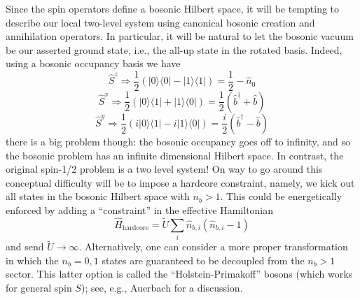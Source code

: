 Since the spin operators define a bosonic Hilbert space, it will be tempting to describe our local two-level system using canonical bosonic creation and annihilation operators. In particular, it will be natural to let the bosonic vacuum be our asserted ground state, i.e., the all-up state in the rotated basis. Indeed, using a bosonic occupancy basis we have
\[ \hat{S}^z\Rightarrow \frac{1}{2}\left( |0\rangle \langle 0|-|1\rangle \langle 1| \right) =\frac{1}{2}-\hat{n}_0\]
\[ \hat{S}^x\Rightarrow \frac{1}{2}\left( |0\rangle \langle 1|+|1\rangle \langle 0| \right) =\frac{1}{2}\left( \hat{b}^{\dagger}+\hat{b} \right) \]
\[ \hat{S}^y\Rightarrow \frac{1}{2}\left( i|0\rangle \langle 1|-i|1\rangle \langle 0| \right) =\frac{i}{2}\left( \hat{b}^{\dagger}-\hat{b} \right) \]
there is a big problem though: the bosonic occupancy goes off to infinity, and so the bosonic problem has an infinite dimensional Hilbert space. In contrast, the original spin-1/2 problem is a two level system! On  way to go around this conceptual difficulty will be to impose a hardcore constraint, namely, we kick out all states in the bosonic Hilbert space with $n_b>1$. This could be energetically enforced by adding a ``constraint'' in the effective Hamiltonian
\[ \hat{H}_{\mathrm{hardcore}}=\tilde{U}\sum_i{\hat{n}_{b,i}\left( \hat{n}_{b,i}-1 \right)}\]
and send $\tilde{U} \to \infty$. Alternatively, one can consider a more proper transformation in which the $n_b=0,1$ states are guaranteed to be decoupled from the $n_b>1$ sector. This latter option is called the ``Holstein-Primakoff'' bosons (which works for general spin $S$); see, e.g., Auerbach for a discussion.

